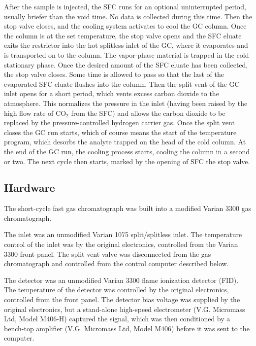 \documentclass[aip,rsi,preprint,graphicx]{revtex4-1} %
\begin{document}
After the sample is injected, the SFC runs for an optional uninterrupted period,
usually briefer than the void time. No data is collected during this time. Then
the stop valve closes, and the cooling system activates to cool the GC column.
Once the column is at the set temperature, the stop valve opens and the SFC
eluate exits the restrictor into the hot splitless inlet of the GC, where it
evaporates and is transported on to the column. The vapor-phase material
is trapped in the cold stationary phase. Once the desired amount
of the SFC eluate has been collected, the stop valve closes. Some time is
allowed to pass so that the last of the evaporated SFC eluate flushes into the
column. Then the split vent of the GC inlet opens for a short period, which
vents excess carbon dioxide to the atmosphere. This normalizes the pressure in
the inlet (having been raised  by the high flow rate of CO$_2$ from the SFC) and
allows the carbon dioxide to be replaced by the pressure-controlled hydrogen
carrier gas. Once the split vent closes the GC run starts, which of course means
the start of the temperature program, which desorbs the analyte trapped on the
head of the cold column. At the end of the GC run, the cooling process starts,
cooling the column in a second or two. The next cycle then starts, marked by the
opening of SFC the stop valve.

\subsection{Hardware}
The short-cycle fast gas chromatograph was built into a modified
Varian\texttrademark{} 3300 gas chromatograph.

The inlet was an unmodified Varian\texttrademark{} 1075 split/splitless inlet.
The temperature control of the inlet was by the original electronics, controlled
from the Varian 3300 front panel. The split vent valve was disconnected from the
gas chromatograph and controlled from the control computer described below.

The detector was an unmodified Varian\texttrademark{} 3300 flame ionization
detector (FID). The temperature of the detector was controlled by the original
electronics, controlled from the front panel. The detector bias voltage was
supplied by the original electronics, but a stand-alone high-speed electrometer
(V.G. Micromass Ltd, Model M406-H) captured the signal, which was then
conditioned by a bench-top amplifier (V.G. Micromass Ltd, Model M406) before it
was sent to the computer.
\end{document}
